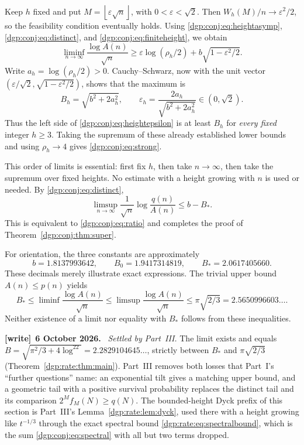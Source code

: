 \documentclass[11pt,letterpaper]{article}
\numberwithin{equation}{section}
\theoremstyle{remark}\newtheorem{remark}[theorem]{Remark}
\newcommand{\floor}[1]{\left\lfloor #1\right\rfloor}
\newenvironment{writenote}[1][]{\par\smallskip\begingroup\small
 \noindent\textbf{[write]}\if\relax\detokenize{#1}\relax\else~\textbf{#1.}\fi\ }%
 {\par\endgroup\smallskip}
\begin{document}
Keep $h$ fixed and put $M=\floor{\varepsilon\sqrt n}$, with
$0<\varepsilon<\sqrt2$. Then $W_h(M)/n\to\varepsilon^2/2$, so
the feasibility condition eventually holds. Using
\eqref{dgp:conj:eq:heightasymp}, \eqref{dgp:conj:eq:distinct}, and
\eqref{dgp:conj:eq:finiteheight}, we obtain
\begin{equation}\label{dgp:conj:eq:heightepsilon}
 \liminf_{n\to\infty}\frac{\log A(n)}{\sqrt n}
 \geq\varepsilon\log(\rho_h/2)
       +b\sqrt{1-\varepsilon^2/2}.
\end{equation}
Write $a_h=\log(\rho_h/2)>0$. Cauchy--Schwarz, now with the
unit vector $(\varepsilon/\sqrt2,\sqrt{1-\varepsilon^2/2})$,
shows that the maximum is
\begin{equation}\label{dgp:conj:eq:Bh}
 B_h=\sqrt{b^2+2a_h^2},\qquad
 \varepsilon_h=\frac{2a_h}{\sqrt{b^2+2a_h^2}}\in(0,\sqrt2).
\end{equation}
Thus the left side of \eqref{dgp:conj:eq:heightepsilon} is at least $B_h$
for \emph{every fixed} integer $h\geq3$. Taking the supremum of
these already established lower bounds and using $\rho_h\to4$
gives \eqref{dgp:conj:eq:strong}.

This order of limits is essential: first fix $h$, then take
$n\to\infty$, then take the supremum over fixed heights. No
estimate with a height growing with $n$ is used or needed.
By \eqref{dgp:conj:eq:distinct},
\[
 \limsup_{n\to\infty}\frac1{\sqrt n}\log\frac{q(n)}{A(n)}
 \leq b-B_*.
\]
This is equivalent to \eqref{dgp:conj:eq:ratio} and completes the proof of
Theorem~\ref{dgp:conj:thm:super}.

For orientation, the three constants are approximately
\[
 b=1.8137993642,\qquad B_0=1.9417314819,\qquad
 B_*=2.0617405660.
\]
These decimals merely illustrate exact expressions. The trivial
upper bound $A(n)\leq p(n)$ yields
\begin{equation}\label{dgp:conj:eq:unknownrate}
 B_*\leq\liminf\frac{\log A(n)}{\sqrt n}
 \leq\limsup\frac{\log A(n)}{\sqrt n}
 \leq\pi\sqrt{2/3}=2.5650996603\ldots.
\end{equation}
Neither existence of a limit nor equality with $B_*$ follows from
these inequalities.
\begin{writenote}[6 October 2026]
\emph{Settled by Part~III.} The limit exists and equals $B=\sqrt{\pi^2/3+4\log^22}=2.2829104645\ldots$, strictly between $B_*$ and $\pi\sqrt{2/3}$ (Theorem~\ref{dgp:rate:thm:main}). Part~III removes both losses that Part~I's ``further questions'' name: an exponential tilt gives a matching upper bound, and a geometric tail with a positive survival probability replaces the distinct tail and its comparison $2^Mf_M(N)\ge q(N)$. The bounded-height Dyck prefix of this section is Part~III's Lemma~\ref{dgp:rate:lem:dyck}, used there with a height growing like $t^{-1/3}$ through the exact spectral bound \eqref{dgp:rate:eq:spectralbound}, which is the sum \eqref{dgp:conj:eq:spectral} with all but two terms dropped.
\end{writenote}
\end{document}
